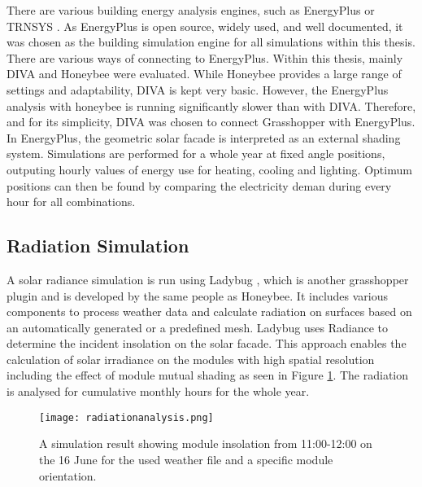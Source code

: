 			There are various building energy analysis engines, such as EnergyPlus \cite{energyplus} or TRNSYS \cite{trnsys}. As EnergyPlus is open source, widely used, and well documented, it was chosen as the building simulation engine for all simulations within this thesis. There are various ways of connecting to EnergyPlus. Within this thesis, mainly DIVA \cite{DIVA} and Honeybee\cite{roudsari2014ladybug} were evaluated. While Honeybee provides a large range of settings and adaptability, DIVA is kept very basic. However, the EnergyPlus analysis with honeybee is running significantly slower than with DIVA. Therefore, and for its simplicity, DIVA was chosen to connect Grasshopper with EnergyPlus. In EnergyPlus, the geometric solar facade is interpreted as an external shading system. Simulations are performed for a whole year at fixed angle positions, outputing hourly values of energy use for heating, cooling and lighting. Optimum positions can then be found by comparing the electricity deman during every hour for all combinations. 

		\subsection{Radiation Simulation} 

			A solar radiance simulation is run using Ladybug \cite{roudsari2014ladybug}, which is another grasshopper plugin and is developed by the same people as Honeybee. It includes various components to process weather data and calculate radiation on surfaces based on an automatically generated or a predefined mesh. Ladybug uses Radiance \cite{ward1994radiance} to determine the incident insolation on the solar facade. This approach enables the calculation of solar irradiance on the modules with high spatial resolution including the effect of module mutual shading as seen in Figure \ref{fig:radiation}. The radiation is analysed for cumulative monthly hours for the whole year. 
			\begin{figure}[H]
			\begin{center}
				\texttt{[image: radiationanalysis.png]}
				\caption{A simulation result showing module insolation from 11:00-12:00 on the 16 June for the used weather file and a specific module orientation.}
				\label{fig:radiation}
			\end{center}
			\end{figure}


